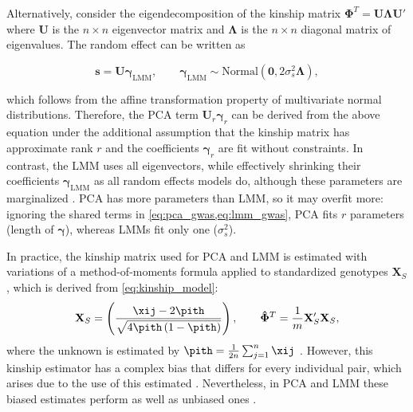 \documentclass[11pt]{article}
\begin{document}
\begin{linenumbers}
Alternatively, consider the eigendecomposition of the kinship matrix $\mathbf{\Phi}^T = \mathbf{U} \mathbf{\Lambda} \mathbf{U}'$ where $\mathbf{U}$ is the $n \times n$ eigenvector matrix and $\mathbf{\Lambda}$ is the $n \times n$ diagonal matrix of eigenvalues.
The random effect can be written as
\begin{linenomath*}
$$
\mathbf{s} = \mathbf{U} \boldsymbol{\gamma}_\text{LMM},
\quad\quad
\boldsymbol{\gamma}_\text{LMM}
\sim \text{Normal}( \mathbf{0}, 2 \sigma_s^2 \boldsymbol{\Lambda})
,
$$
\end{linenomath*}
which follows from the affine transformation property of multivariate normal distributions.
Therefore, the PCA term $\mathbf{U}_r \boldsymbol{\gamma}_r$ can be derived from the above equation under the additional assumption that the kinship matrix has approximate rank $r$ and the coefficients $\boldsymbol{\gamma}_r$ are fit without constraints.
In contrast, the LMM uses all eigenvectors, while effectively shrinking their coefficients $\boldsymbol{\gamma}_\text{LMM}$ as all random effects models do, although these parameters are marginalized \citep{astle_population_2009, janss_inferences_2012, hoffman_correcting_2013, zhang_principal_2015}.
PCA has more parameters than LMM, so it may overfit more: ignoring the shared terms in \cref{eq:pca_gwas,eq:lmm_gwas}, PCA fits $r$ parameters (length of $\boldsymbol{\gamma}$), whereas LMMs fit only one ($\sigma^2_s$).

In practice, the kinship matrix used for PCA and LMM is estimated with variations of a method-of-moments formula applied to standardized genotypes $\mathbf{X}_S$, which is derived from \cref{eq:kinship_model}:
\begin{equation}
  \label{eq:kinship_std}
  \mathbf{X}_S
  =
  \left(
    \frac{
      \xij - 2 \pith
    }{
      \sqrt{4 \pith \left( 1 - \pith \right)}
    }
  \right)
  ,
  \quad\quad
  \mathbf{\hat{\Phi}}^T
  =
  \frac{1}{m}
  \mathbf{X}_S'
  \mathbf{X}_S
  ,
\end{equation}
where the unknown \pit is estimated by
$
\pith = \frac{1}{2n} \sum_{j = 1}^n \xij
$
\citep{price_principal_2006, kang_efficient_2008, kang_variance_2010, yang_gcta:_2011, zhou_genome-wide_2012, yang_advantages_2014, loh_efficient_2015, sul_population_2018, zhou_efficiently_2018}.
However, this kinship estimator has a complex bias that differs for every individual pair, which arises due to the use of this estimated \pith \citep{ochoa_estimating_2021, ochoa_new_2019}.
Nevertheless, in PCA and LMM these biased estimates perform as well as unbiased ones \citep{hou_genetic_2023}.


\end{linenumbers}
\end{document}
